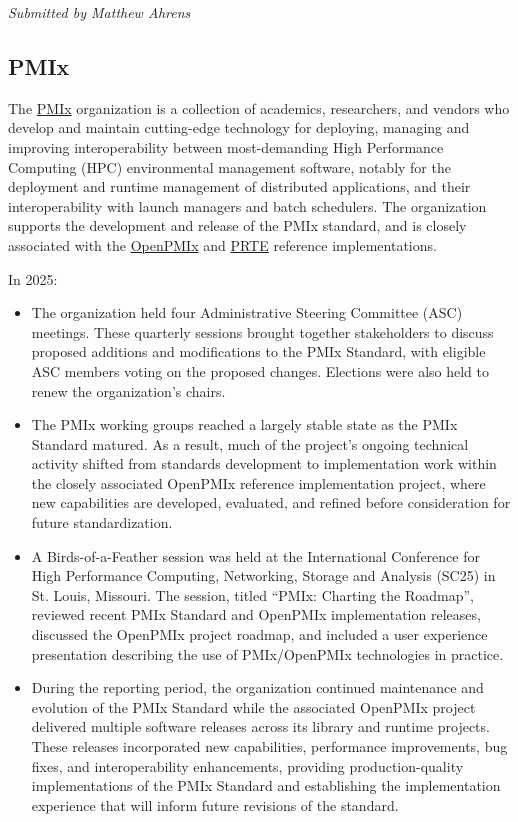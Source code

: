 \documentclass[a4paper]{report}
\begin{document}
{\em Submitted by Matthew Ahrens}

\subsection{PMIx}

The \href{https://pmix.org/}{PMIx} organization is a collection of academics, researchers, and vendors who develop and maintain cutting-edge technology for deploying, managing and improving interoperability between most-demanding High Performance Computing (HPC) environmental management software, notably for the deployment and runtime management of distributed applications, and their interoperability with launch managers and batch schedulers. The organization supports the development and release of the PMIx standard, and is closely associated with the \href{https://openpmix.org/}{OpenPMIx} and \href{https://github.com/openpmix/prrte}{PRTE} reference implementations.

In 2025:

\begin{itemize}
\item The organization held four Administrative Steering Committee (ASC) meetings. These quarterly sessions brought together stakeholders to discuss proposed additions and modifications to the PMIx Standard, with eligible ASC members voting on the proposed changes. Elections were also held to renew the organization's chairs.

\item The PMIx working groups reached a largely stable state as the PMIx Standard matured. As a result, much of the project's ongoing technical activity shifted from standards development to implementation work within the closely associated OpenPMIx reference implementation project, where new capabilities are developed, evaluated, and refined before consideration for future standardization.

\item A Birds-of-a-Feather session was held at the International Conference for High Performance Computing, Networking, Storage and Analysis (SC25) in St. Louis, Missouri. The session, titled ``PMIx: Charting the Roadmap'', reviewed recent PMIx Standard and OpenPMIx implementation releases, discussed the OpenPMIx project roadmap, and included a user experience presentation describing the use of PMIx/OpenPMIx technologies in practice.

\item During the reporting period, the organization continued maintenance and evolution of the PMIx Standard while the associated OpenPMIx project delivered multiple software releases across its library and runtime projects. These releases incorporated new capabilities, performance improvements, bug fixes, and interoperability enhancements, providing production-quality implementations of the PMIx Standard and establishing the implementation experience that will inform future revisions of the standard.
\end{itemize}
\end{document}
